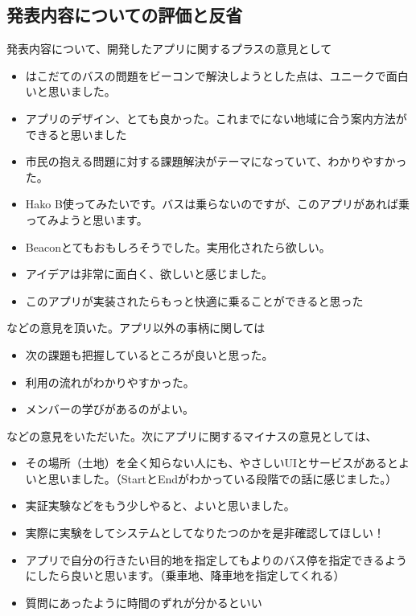 \documentclass[openany,11pt,papersize]{jsbook}
\begin{document}
\subsection{発表内容についての評価と反省}
発表内容について、開発したアプリに関するプラスの意見として
\begin{itemize}

\item はこだてのバスの問題をビーコンで解決しようとした点は、ユニークで面白いと思いました。
\item アプリのデザイン、とても良かった。これまでにない地域に合う案内方法ができると思いました
\item 市民の抱える問題に対する課題解決がテーマになっていて、わかりやすかった。
\item Hako B使ってみたいです。バスは乗らないのですが、このアプリがあれば乗ってみようと思います。
\item Beaconとてもおもしろそうでした。実用化されたら欲しい。
\item アイデアは非常に面白く、欲しいと感じました。
\item このアプリが実装されたらもっと快適に乗ることができると思った

\end{itemize}
などの意見を頂いた。アプリ以外の事柄に関しては
\begin{itemize}

\item 次の課題も把握しているところが良いと思った。
\item 利用の流れがわかりやすかった。
\item メンバーの学びがあるのがよい。

\end{itemize}
などの意見をいただいた。次にアプリに関するマイナスの意見としては、
\begin{itemize}

\item その場所（土地）を全く知らない人にも、やさしいUIとサービスがあるとよいと思いました。（StartとEndがわかっている段階での話に感じました。）
\item 実証実験などをもう少しやると、よいと思いました。
\item 実際に実験をしてシステムとしてなりたつのかを是非確認してほしい！
\item アプリで自分の行きたい目的地を指定してもよりのバス停を指定できるようにしたら良いと思います。（乗車地、降車地を指定してくれる）
\item 質問にあったように時間のずれが分かるといい

\end{itemize}
\end{document}
